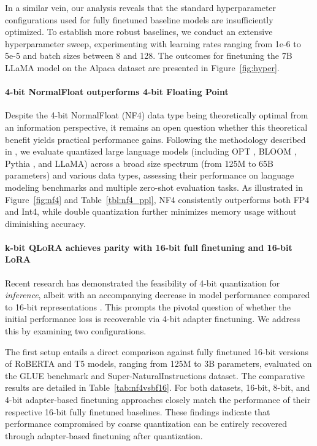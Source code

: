 In a similar vein, our analysis reveals that the standard hyperparameter configurations used for fully finetuned baseline models are insufficiently optimized. To establish more robust baselines, we conduct an extensive hyperparameter sweep, experimenting with learning rates ranging from 1e-6 to 5e-5 and batch sizes between 8 and 128. The outcomes for finetuning the 7B LLaMA model on the Alpaca dataset are presented in Figure~\ref{fig:hyper}.

\paragraph{4-bit NormalFloat outperforms 4-bit Floating Point}

Despite the 4-bit NormalFloat (NF4) data type being theoretically optimal from an information perspective, it remains an open question whether this theoretical benefit yields practical performance gains. Following the methodology described in \citet{dettmers2022case}, we evaluate quantized large language models (including OPT \citep{zhang2022opt}, BLOOM \cite{scao2022bloom}, Pythia \cite{biderman2023pythia}, and LLaMA) across a broad size spectrum (from 125M to 65B parameters) and various data types, assessing their performance on language modeling benchmarks and multiple zero-shot evaluation tasks. As illustrated in Figure~\ref{fig:nf4} and Table~\ref{tbl:nf4_ppl}, NF4 consistently outperforms both FP4 and Int4, while double quantization further minimizes memory usage without diminishing accuracy.

\paragraph{k-bit \textsc{QLoRA} achieves parity with 16-bit full finetuning and 16-bit LoRA}

Recent research has demonstrated the feasibility of 4-bit quantization for \emph{inference}, albeit with an accompanying decrease in model performance compared to 16-bit representations \citep{dettmers2022case,frantar2022gptq}. This prompts the pivotal question of whether the initial performance loss is recoverable via 4-bit adapter finetuning. We address this by examining two configurations.

The first setup entails a direct comparison against fully finetuned 16-bit versions of RoBERTA and T5 models, ranging from 125M to 3B parameters, evaluated on the GLUE benchmark and Super-NaturalInstructions dataset. The comparative results are detailed in Table~\ref{tab:nf4vsbf16}. For both datasets, 16-bit, 8-bit, and 4-bit adapter-based finetuning approaches closely match the performance of their respective 16-bit fully finetuned baselines. These findings indicate that performance compromised by coarse quantization can be entirely recovered through adapter-based finetuning after quantization.

